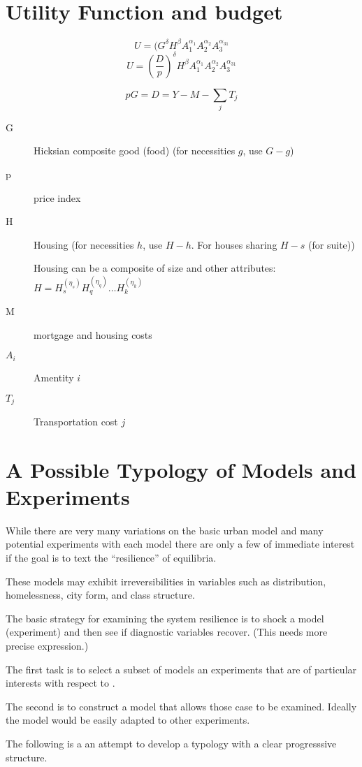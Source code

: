 \documentclass[preview, 12pt]{standalone}
\begin{document}
\section{Utility Function and budget}

\[ U=(G^\delta H^\beta  A_1^{\alpha_1}  A_2^{\alpha_2}A_3^{\alpha_31}\]
\[ U=(\frac{D}{p})^\delta H^\beta  A_1^{\alpha_1}  A_2^{\alpha_2}A_3^{\alpha_31}\]

\[pG=D=Y-M-\sum_jT_j\]

\begin{description}
\item[G]Hicksian composite good  (food) (for necessities $g$, use $G-g$)
\item[p]price index
\item[H]Housing  (for necessities $h$, use $H-h$. For houses sharing $H-s$ (for suite))

Housing can be a composite of size and other attributes: $H=H_s^(\eta_s) H_q^(\eta_q)\dots H_k^(\eta_k)$
\item[M] mortgage and housing costs 
\item[$A_i$] Amentity $i$
\item[$T_j$]Transportation cost $j$


\end{description}

\section{A Possible Typology of Models and Experiments}
While there  are very many variations on the basic urban model and many potential experiments with each model there are only a few of immediate interest if the goal is to text the ``resilience'' of equilibria.

These models may exhibit irreversibilities in variables such as distribution, homelessness, city form, and class structure. 


The  basic strategy for examining the system resilience is to shock a model (experiment) and then see if diagnostic variables recover. (This needs more precise expression.)


The first task is to select a subset of models an experiments that are of particular interests with respect to .

The second is to construct  a model that allows those case to be examined. Ideally the model would be easily adapted to other experiments.

The following is a an attempt to develop a typology with a clear  progresssive structure.
\end{document}
